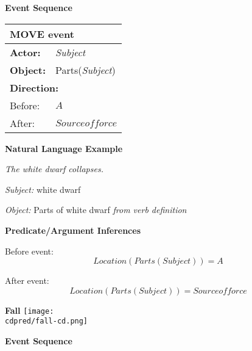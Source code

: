 \documentclass[\mainfile]{subfiles}
\begin{document}
\textbf{Event Sequence}
\begin{center}
    \begin{tabular}{l l}
      \toprule
      \multicolumn{2}{l}{\textbf{MOVE event}}\\
      \hline
      \textbf{Actor:} & \textit{Subject}\\
      \textbf{Object:} & Parts(\textit{Subject})\\
      
      \multicolumn{2}{l}{\textbf{Direction:}} \\
      Before: & \(A\) \\
      After: & \(Source of force\) \\
      \bottomrule
    \end{tabular}
    
\end{center}

\textbf{Natural Language Example}

\textit{The white dwarf collapses.}

\textit{Subject:} white dwarf

\textit{Object:} Parts of white dwarf \textit{from verb definition}

\bigskip

\textbf{Predicate/Argument Inferences}


Before event:
\[Location(Parts(Subject)) = A\]

After event:
\[Location(Parts(Subject)) = Source of force\]
\newpage

\textbf{Fall}
\texttt{[image: \\cdpred/fall-cd.png]}
\bigskip

\textbf{Event Sequence}
\end{document}
